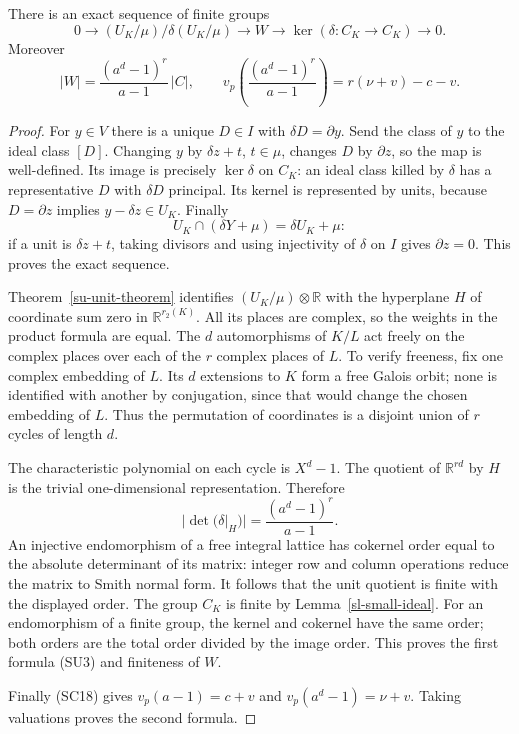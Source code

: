 \begin{lemma}\label{su-exact}
There is an exact sequence of finite groups
\[
 0\longrightarrow
 (U_K/\mu)/\delta(U_K/\mu)
 \longrightarrow W
 \longrightarrow\ker(\delta:C_K\to C_K)
 \longrightarrow0.
 \tag{SU2}
\]
Moreover
\[
 |W|=\frac{(a^d-1)^r}{a-1}\,|C|,
 \qquad
 v_p\!\left(\frac{(a^d-1)^r}{a-1}\right)
                    =r(\nu+v)-c-v .
 \tag{SU3}
\]
\end{lemma}
\begin{proof}
For $y\in V$ there is a unique $D\in I$ with
$\delta D=\partial y$.  Send the class of $y$ to the ideal
class $[D]$.  Changing $y$ by $\delta z+t$, $t\in\mu$,
changes $D$ by $\partial z$, so the map is well-defined.
Its image is precisely $\ker\delta$ on $C_K$: an ideal
class killed by $\delta$ has a representative $D$ with
$\delta D$ principal.  Its kernel is represented by units,
because $D=\partial z$ implies $y-\delta z\in U_K$.
Finally
\[
             U_K\cap(\delta Y+\mu)=\delta U_K+\mu:
\]
if a unit is $\delta z+t$, taking divisors and using
injectivity of $\delta$ on $I$ gives $\partial z=0$.
This proves the exact sequence.

Theorem~\ref{su-unit-theorem} identifies $(U_K/\mu)\otimes\mathbb R$
with the hyperplane $H$ of coordinate sum zero in
$\mathbb R^{r_2(K)}$.  All its places are complex, so
the weights in the product formula are equal.
The $d$ automorphisms of $K/L$ act freely on the complex
places over each of the $r$ complex places of $L$.
To verify freeness, fix one complex embedding of $L$.
Its $d$ extensions to $K$ form a free Galois orbit;
none is identified with another by conjugation, since
that would change the chosen embedding of $L$.
Thus the permutation of coordinates is a disjoint union
of $r$ cycles of length $d$.

The characteristic polynomial on each cycle is $X^d-1$.
The quotient of $\mathbb R^{rd}$ by $H$ is the trivial
one-dimensional representation.  Therefore
\[
        |\det(\delta|_H)|=\frac{(a^d-1)^r}{a-1}.
\]
An injective endomorphism of a free integral lattice has
cokernel order equal to the absolute determinant of its
matrix: integer row and column operations reduce the
matrix to Smith normal form.  It follows that the unit
quotient is finite with the displayed order.
The group $C_K$ is finite by Lemma~\ref{sl-small-ideal}.
For an endomorphism of a finite group, the kernel and
cokernel have the same order; both orders are the total
order divided by the image order.  This proves the first
formula (SU3) and finiteness of $W$.

Finally (SC18) gives
$v_p(a-1)=c+v$ and $v_p(a^d-1)=\nu+v$.
Taking valuations proves the second formula.
\end{proof}

